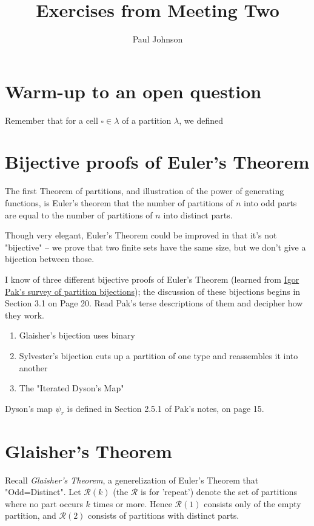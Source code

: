 \documentclass{article}
\title{Exercises from Meeting Two}
\author{Paul Johnson}
\theoremstyle{definition}
\begin{document}
\maketitle

\section{Warm-up to an open question}
Remember that for a cell $\square\in\lambda$ of a partition $\lambda$, we defined 


\section{Bijective proofs of Euler's Theorem}
The first Theorem of partitions, and illustration of the power of generating functions, is Euler's theorem that the number of partitions of $n$ into odd parts are equal to the number of partitions of $n$ into distinct parts.  

Though very elegant, Euler's Theorem could be improved in that it's not "bijective" -- we prove that two finite sets have the same size, but we don't give a bijection between those.  

I know of three different bijective proofs of Euler's Theorem (learned from \href{https://www.math.ucla.edu/~pak/papers/psurvey.pdf}{Igor Pak's survey of partition bijections}); the discussion of these bijections begins in Section 3.1 on Page 20. Read Pak's terse descriptions of them and decipher how they work.
\begin{enumerate}
\item Glaisher's bijection uses binary
\item Sylvester's bijection cuts up a partition of one type and reassembles it into another
\item The "Iterated Dyson's Map" 
\end{enumerate}
Dyson's map $\psi_r$ is defined in Section 2.5.1 of Pak's notes, on page 15.



\section{Glaisher's Theorem}
Recall \emph{Glaisher's Theorem}, a generelization of Euler's Theorem that "Odd=Distinct".
Let $\mathcal{R}(k)$ (the $\mathcal{R}$ is for 'repeat') denote the set of partitions where no part occurs $k$ times or more. Hence $\mathcal{R}(1)$ consists only of the empty partition, and $\mathcal{R}(2)$ consists of partitions with distinct parts.
\end{document}
